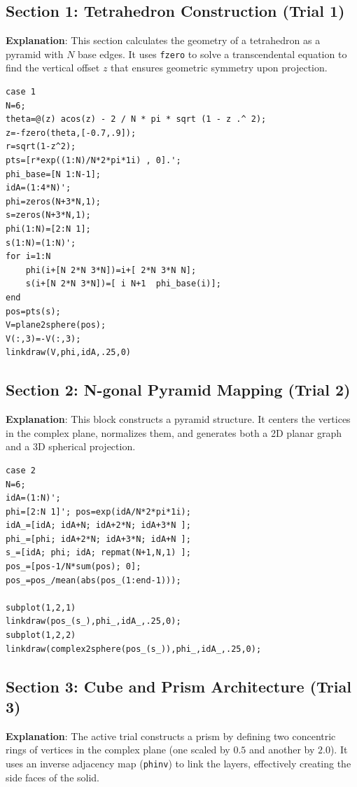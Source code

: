 \subsection{Section 1: Tetrahedron Construction (Trial 1)}
\textbf{Explanation}: This section calculates the geometry of a tetrahedron as a pyramid with $N$ base edges. It uses \texttt{fzero} to solve a transcendental equation to find the vertical offset $z$ that ensures geometric symmetry upon projection.

\begin{lstlisting}
case 1 
N=6; 
theta=@(z) acos(z) - 2 / N * pi * sqrt (1 - z .^ 2);
z=-fzero(theta,[-0.7,.9]);
r=sqrt(1-z^2);
pts=[r*exp((1:N)/N*2*pi*1i) , 0].';
phi_base=[N 1:N-1];
idA=(1:4*N)';
phi=zeros(N+3*N,1);
s=zeros(N+3*N,1);
phi(1:N)=[2:N 1];
s(1:N)=(1:N)';
for i=1:N
    phi(i+[N 2*N 3*N])=i+[ 2*N 3*N N];
    s(i+[N 2*N 3*N])=[ i N+1  phi_base(i)];
end
pos=pts(s);
V=plane2sphere(pos);
V(:,3)=-V(:,3);
linkdraw(V,phi,idA,.25,0)
\end{lstlisting}

\subsection{Section 2: N-gonal Pyramid Mapping (Trial 2)}
\textbf{Explanation}: This block constructs a pyramid structure. It centers the vertices in the complex plane, normalizes them, and generates both a 2D planar graph and a 3D spherical projection.

\begin{lstlisting}
case 2 
N=6;
idA=(1:N)';
phi=[2:N 1]'; pos=exp(idA/N*2*pi*1i);
idA_=[idA; idA+N; idA+2*N; idA+3*N ];
phi_=[phi; idA+2*N; idA+3*N; idA+N ];
s_=[idA; phi; idA; repmat(N+1,N,1) ];
pos_=[pos-1/N*sum(pos); 0];
pos_=pos_/mean(abs(pos_(1:end-1)));

subplot(1,2,1)
linkdraw(pos_(s_),phi_,idA_,.25,0);
subplot(1,2,2)
linkdraw(complex2sphere(pos_(s_)),phi_,idA_,.25,0);
\end{lstlisting}

\subsection{Section 3: Cube and Prism Architecture (Trial 3)}
\textbf{Explanation}: The active trial constructs a prism by defining two concentric rings of vertices in the complex plane (one scaled by $0.5$ and another by $2.0$). It uses an inverse adjacency map (\texttt{phinv}) to link the layers, effectively creating the side faces of the solid.


